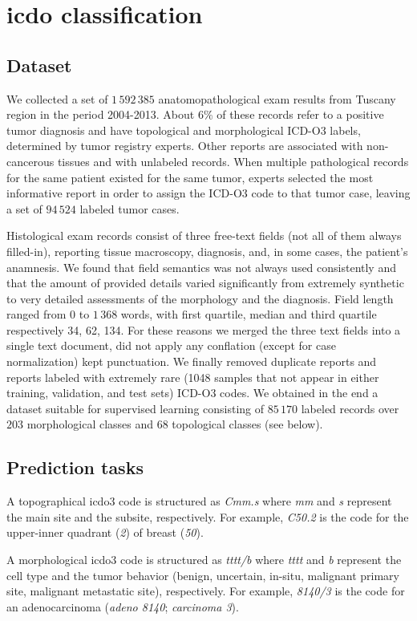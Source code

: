 \chapter{\ac{icdo} classification}
\label{ch:icdo}

\section{Dataset}
We collected a set of $1\,592\,385$ anatomopathological exam results
from Tuscany region in the period 2004-2013. About $6\%$
of these records refer to a positive tumor
diagnosis and have topological and morphological ICD-O3 labels,
determined by tumor registry experts. Other reports are associated
with non-cancerous tissues and with unlabeled records. When multiple
pathological records for the
same patient existed for the same tumor, experts selected the most
informative report in order to assign the ICD-O3 code to that tumor
case, leaving a set of $94\,524$ labeled tumor cases.

Histological exam records consist of three free-text fields (not all
of them always filled-in), reporting tissue macroscopy, diagnosis,
and, in some cases, the patient's anamnesis. We found that field
semantics was not always used consistently and that the amount of
provided details varied significantly from extremely synthetic to very
detailed assessments of the morphology and the diagnosis. Field length
ranged from $0$ to $1\,368$ words, with first quartile, median and
third quartile respectively 34, 62, 134. For these reasons we merged
the three text fields
into a single text document, did not apply any conflation (except for
case normalization) kept punctuation. We finally removed duplicate
reports and reports labeled with extremely rare (1048
samples that not
appear in either training, validation, and test sets) ICD-O3 codes. We
obtained in the end 
a dataset suitable for supervised learning consisting of $85\,170$
labeled records over $203$ morphological classes and $68$
topological classes (see below).

\section{Prediction tasks}
A topographical \ac{icdo3} code is structured as \emph{Cmm.s} where
\emph{mm} and \emph{s} represent the main site and the subsite,
respectively. For example, \emph{C50.2}
is the code for the upper-inner quadrant (\emph{2}) of breast (\emph{50}).

A morphological \ac{icdo3} code is structured as \emph{tttt/b}
where \emph{tttt} and \emph{b} represent the cell type and the tumor
behavior (benign, uncertain, in-situ, malignant primary site,
malignant metastatic site), respectively. For example, \emph{8140/3}
is the code for an adenocarcinoma (\emph{adeno 8140};
\emph{carcinoma 3}).

